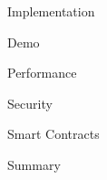 \documentclass{beamer}
\begin{document}
\begin{frame}{Implementation}%
    
\end{frame}

\begin{frame}{Demo}%
    
\end{frame}

\begin{frame}{Performance}%
    
\end{frame}

\begin{frame}{Security}%
    
\end{frame}

\begin{frame}{Smart Contracts}%
    
\end{frame}

\begin{frame}{Summary}%
    
\end{frame}
\end{document}
